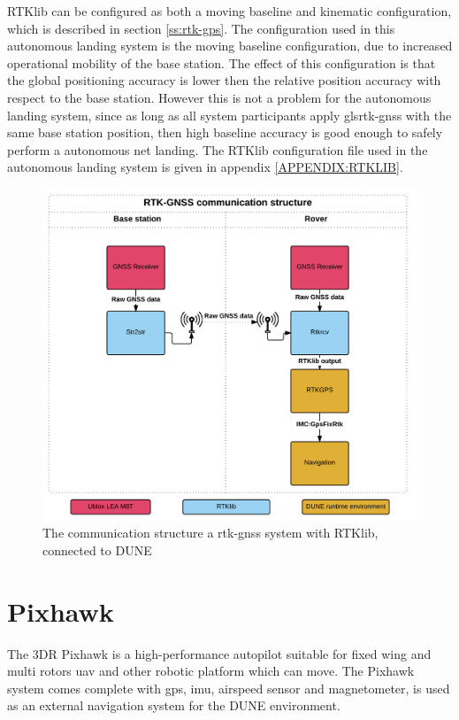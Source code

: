 RTKlib can be configured as both a moving baseline and kinematic configuration, which is described in section \ref{ss:rtk-gps}. The configuration used in this autonomous landing system is the moving baseline configuration, due to increased operational mobility of the base station. The effect of this configuration is that the global positioning accuracy is lower then the relative position accuracy with respect to the base station. However this is not a problem for the autonomous landing system, since as long as all system participants apply gls{rtk-gnss} with the same base station position, then high baseline accuracy is good enough to safely perform a autonomous net landing. The RTKlib configuration file used in the autonomous landing system is given in appendix \ref{APPENDIX:RTKLIB}.
\begin{figure}[h]
	\centering
		\includegraphics[scale=0.7]{figs/RTKGNSS.png}
		\caption{The communication structure a \gls{rtk-gnss} system with RTKlib, connected to DUNE}
		\label{figure:RTKLIB_STRUCTURE}
\end{figure}
\newpage

\section{Pixhawk}\label{ss:Pixhawk}
The 3DR Pixhawk is a high-performance autopilot suitable for fixed wing and multi rotors \gls{uav} and other robotic platform which can move. The Pixhawk system comes complete with \gls{gps}, imu, airspeed sensor and magnetometer, is used as an external navigation system for the DUNE environment.
